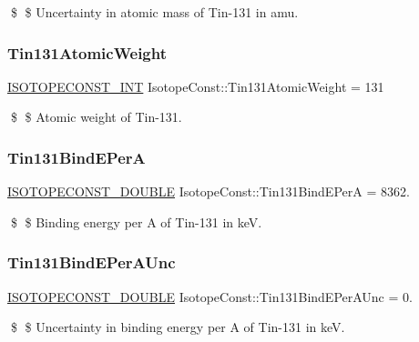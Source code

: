 \$ \$ Uncertainty in atomic mass of Tin-\/131 in amu. \mbox{\label{group___isotope_const-_tin-_sn131_gad2f0c6c9692c13fc2ffca5f14fe9cc88}} 
\subsubsection{\texorpdfstring{Tin131\+Atomic\+Weight}{Tin131AtomicWeight}}
{\footnotesize\ttfamily \mbox{\hyperlink{group___isotope_const-_macros_ga5f18360b3e99483a35c32d789e62621c}{I\+S\+O\+T\+O\+P\+E\+C\+O\+N\+S\+T\+\_\+\+I\+NT}} Isotope\+Const\+::\+Tin131\+Atomic\+Weight = 131}

\$ \$ Atomic weight of Tin-\/131. \mbox{\label{group___isotope_const-_tin-_sn131_gad7054a283aaaf5c9ca97a3d6a1944da7}} 
\subsubsection{\texorpdfstring{Tin131\+Bind\+E\+PerA}{Tin131BindEPerA}}
{\footnotesize\ttfamily \mbox{\hyperlink{group___isotope_const-_macros_ga8f45a7272ce02c0b4c65c44636ed719a}{I\+S\+O\+T\+O\+P\+E\+C\+O\+N\+S\+T\+\_\+\+D\+O\+U\+B\+LE}} Isotope\+Const\+::\+Tin131\+Bind\+E\+PerA = 8362.}

\$ \$ Binding energy per A of Tin-\/131 in keV. \mbox{\label{group___isotope_const-_tin-_sn131_gadbcd71faa351ea87a0864764eddbc29d}} 
\subsubsection{\texorpdfstring{Tin131\+Bind\+E\+Per\+A\+Unc}{Tin131BindEPerAUnc}}
{\footnotesize\ttfamily \mbox{\hyperlink{group___isotope_const-_macros_ga8f45a7272ce02c0b4c65c44636ed719a}{I\+S\+O\+T\+O\+P\+E\+C\+O\+N\+S\+T\+\_\+\+D\+O\+U\+B\+LE}} Isotope\+Const\+::\+Tin131\+Bind\+E\+Per\+A\+Unc = 0.}

\$ \$ Uncertainty in binding energy per A of Tin-\/131 in keV. \mbox{\label{group___isotope_const-_tin-_sn131_gaa216cc3fdce410b7589f5f4705a855d7}} 
